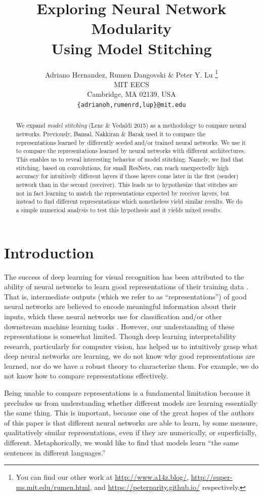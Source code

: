\documentclass{article} %
\title{Exploring Neural Network Modularity \\ Using Model Stitching}
\author{Adriano Hernandez, Rumen Dangovski \& Peter Y. Lu \thanks{You can find our other work at \url{http://www.a14z.blog/}, \url{http://super-ms.mit.edu/rumen.html}, and \url{https://peterparity.github.io/} respectively.} \\
MIT EECS\\
Cambridge, MA 02139, USA \\
\texttt{\{adrianoh,rumenrd,lup\}@mit.edu}
}
\begin{document}
\maketitle

\begin{abstract}
We expand \textit{model stitching} (Lenc \& Vedaldi 2015) as a methodology to compare neural networks.
Previously, Bansal, Nakkiran \& Barak used it to compare the representations learned by differently seeded
and/or trained neural networks.
We use it to compare the representations learned by neural networks with different architectures.
This enables us to reveal interesting behavior of model stitching. Namely, we find that stitching, 
based on convolutions, for small ResNets, can reach unexpectedly
high accuracy for intuitively different layers if those layers come later in the first (sender) network than in
the second (receiver). This leads us to hypothesize that stitches are not in fact learning to match the
representations expected by receiver layers, but instead to find different representations which nonetheless
yield similar results.
We do a simple numerical analysis to test this hypothesis and it yields mixed results.
\end{abstract}

\section{Introduction}
\label{Introduction}
The success of deep learning for visual recognition has been attributed to the ability of neural networks to learn
good representations of their training data \cite{Rumelhart1986LearningIR}. That is, intermediate outputs (which we refer
to as ``representations'') of good neural networks 
are believed to encode meaningful information about their inputs, which these neural networks use for classification and/or other
downstream machine learning tasks \cite{goodfellow2016deep}.
However, our understanding of these representations is somewhat limited. Though
deep learning interpretability research, particularly for computer vision, has helped us
to intuitively grasp what deep neural 
networks are learning, we do not
know why good representations are learned, nor do we have a robust theory to characterize them. For example, we do not
know how to compare representations effectively.\cite{He2016DeepRL}

Being unable to compare representations is a fundamental limitation because it precludes us from understanding whether
different models are learning essentially the same thing. This is important, because one of the great hopes of the authors
of this paper is that
different neural networks are able to learn, by some measure, qualitatively similar representations, even if they are
numerically, or superficially, different. Metaphorically,
we would like to find that models learn ``the same sentences in different languages.''
\end{document}
